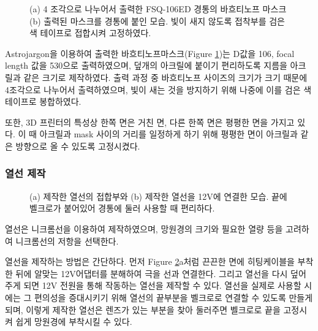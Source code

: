\begin{figure}[ht]
	\begin{center}
	\end{center}
	\caption{(a) 4 조각으로 나누어서 출력한 FSQ-106ED 경통의 바흐티노프 마스크 (b) 출력된 마스크를 경통에 붙인 모습. 빛이 새지 않도록 접착부를 검은색 테이프로 접합시켜 고정하였다.}
	\label{mask}
\end{figure}

Astrojargon을 이용하여 출력한 바흐티노프마스크(\textrm{Figure} \ref{mask})는 D값을 106, focal length 값을 530으로 출력하였으며, 덮개의 아크릴에 붙이기 편리하도록 지름을 아크릴과 같은 크기로 제작하였다. 출력 과정 중 바흐티노프 사이즈의 크기가 크기 때문에 4조각으로 나누어서 출력하였으며, 빛이 새는 것을 방지하기 위해 나중에 이를 검은 색 테이프로 봉합하였다. 


또한, 3D 프린터의 특성상 한쪽 면은 거친 면, 다른 한쪽 면은 평평한 면을 가지고 있다. 이 때 아크릴과 mask 사이의 거리를 일정하게 하기 위해 평평한 면이 아크릴과 같은 방향으로 올 수 있도록 고정시켰다.

\subsubsection{열선 제작}
\begin{figure}[h]
	\begin{center}
	\end{center}
	\caption{(a) 제작한 열선의 접합부와 (b) 제작한 열선을 12V에 연결한 모습. 끝에 벨크로가 붙어있어 경통에 둘러 사용할 때 편리하다.}
	\label{thermic}
\end{figure}

열선은  니크롬선을 이용하여 제작하였으며, 망원경의 크기와 필요한 열량 등을 고려하여 니크롬선의 저항을 선택한다.

열선을 제작하는 방법은 간단하다. 먼저 \textrm{Figure} \ref{thermic}a처럼 끈끈한 면에 히팅케이블을 부착한 뒤에 알맞는 12V어댑터를 분해하여 극을 선과 연결한다. 그리고 열선을 다시 덮어주게 되면 12V 전원을 통해 작동하는 열선을 제작할 수 있다. 열선을 실제로 사용할 시에는 그 편의성을 증대시키기 위해 열선의 끝부분을 벨크로로 연결할 수 있도록 만들게 되며, 이렇게 제작한 열선은 렌즈가 있는 부분을 찾아 둘러주면 벨크로로 끝을 고정시켜 쉽게 망원경에 부착시킬 수 있다.






